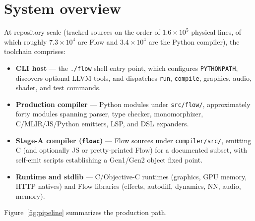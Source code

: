 \documentclass[11pt,a4paper]{article}
\theoremstyle{remark}
\begin{document}
\section{System overview}
\label{sec:overview}

At repository scale (tracked sources on the order of $1.6\times 10^5$ physical
lines, of which roughly $7.3\times 10^4$ are Flow and $3.4\times 10^4$ are the
Python compiler), the toolchain comprises:

\begin{itemize}[leftmargin=*,itemsep=0.2em]
  \item \textbf{CLI host} --- the \texttt{./flow} shell entry point, which
        configures \texttt{PYTHONPATH}, discovers optional LLVM tools, and
        dispatches \texttt{run}, \texttt{compile}, graphics, audio, shader,
        and test commands.
  \item \textbf{Production compiler} --- Python modules under
        \texttt{src/flow/}, approximately forty modules spanning parser, type
        checker, monomorphizer, C/MLIR/JS/Python emitters, LSP, and DSL
        expanders.
  \item \textbf{Stage-A compiler (\texttt{flowc})} --- Flow sources under
        \texttt{compiler/src/}, emitting C (and optionally JS or pretty-printed
        Flow) for a documented subset, with self-emit scripts establishing a
        Gen1/Gen2 object fixed point.
  \item \textbf{Runtime and stdlib} --- C/Objective-C runtimes (graphics, GPU
        memory, HTTP natives) and Flow libraries (effects, autodiff, dynamics,
        NN, audio, memory).
\end{itemize}

Figure~\ref{fig:pipeline} summarizes the production path.
\end{document}
